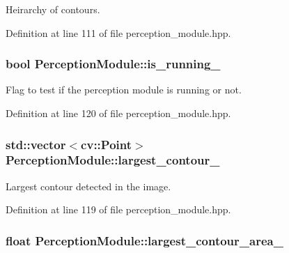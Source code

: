 Heirarchy of contours. 



Definition at line 111 of file perception\+\_\+module.\+hpp.

\subsubsection[{\texorpdfstring{is\+\_\+running\+\_\+}{is_running_}}]{\setlength{\rightskip}{0pt plus 5cm}bool Perception\+Module\+::is\+\_\+running\+\_\+\hspace{0.3cm}{\ttfamily [private]}}\hypertarget{class_perception_module_a95211a0bd4fe047b0e22e4afb7c50e26}{}\label{class_perception_module_a95211a0bd4fe047b0e22e4afb7c50e26}
Flag to test if the perception module is running or not. 

Definition at line 120 of file perception\+\_\+module.\+hpp.

\subsubsection[{\texorpdfstring{largest\+\_\+contour\+\_\+}{largest_contour_}}]{\setlength{\rightskip}{0pt plus 5cm}std\+::vector$<$cv\+::\+Point$>$ Perception\+Module\+::largest\+\_\+contour\+\_\+\hspace{0.3cm}{\ttfamily [private]}}\hypertarget{class_perception_module_a1bd3cb41f94fa253954018392a4ebdb9}{}\label{class_perception_module_a1bd3cb41f94fa253954018392a4ebdb9}


Largest contour detected in the image. 



Definition at line 119 of file perception\+\_\+module.\+hpp.

\subsubsection[{\texorpdfstring{largest\+\_\+contour\+\_\+area\+\_\+}{largest_contour_area_}}]{\setlength{\rightskip}{0pt plus 5cm}float Perception\+Module\+::largest\+\_\+contour\+\_\+area\+\_\+\hspace{0.3cm}{\ttfamily [private]}}\hypertarget{class_perception_module_aa20adfc7b4a473435fc98df6353b6fd6}{}\label{class_perception_module_aa20adfc7b4a473435fc98df6353b6fd6}


